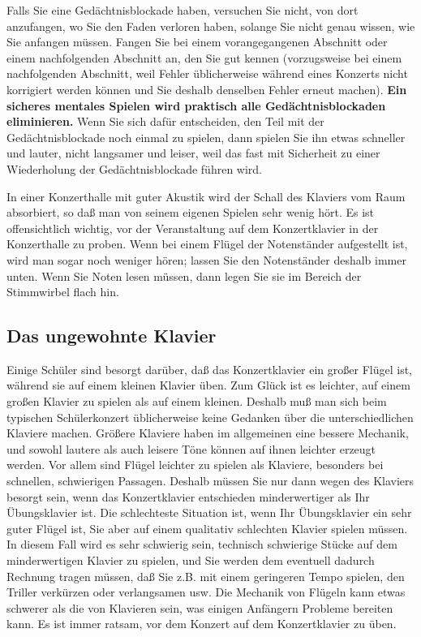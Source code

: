 Falls Sie eine Gedächtnisblockade haben, versuchen Sie nicht, von dort anzufangen, wo Sie den Faden verloren haben, solange Sie nicht genau wissen, wie Sie anfangen müssen.
Fangen Sie bei einem vorangegangenen Abschnitt oder einem nachfolgenden Abschnitt an, den Sie gut kennen (vorzugsweise bei einem nachfolgenden Abschnitt, weil Fehler üblicherweise während eines Konzerts nicht korrigiert werden können und Sie deshalb denselben Fehler erneut machen).
\textbf{Ein sicheres mentales Spielen wird praktisch alle Gedächtnisblockaden eliminieren.}
Wenn Sie sich dafür entscheiden, den Teil mit der Gedächtnisblockade noch einmal zu spielen, dann spielen Sie ihn etwas schneller und lauter, nicht langsamer und leiser, weil das fast mit Sicherheit zu einer Wiederholung der Gedächtnisblockade führen wird.

In einer Konzerthalle mit guter Akustik wird der Schall des Klaviers vom Raum absorbiert, so daß man von seinem eigenen Spielen sehr wenig hört.
Es ist offensichtlich wichtig, vor der Veranstaltung auf dem Konzertklavier in der Konzerthalle zu proben.
Wenn bei einem Flügel der Notenständer aufgestellt ist, wird man sogar noch weniger hören; lassen Sie den Notenständer deshalb immer unten.
Wenn Sie Noten lesen müssen, dann legen Sie sie im Bereich der Stimmwirbel flach hin.


\subsection{Das ungewohnte Klavier}\hypertarget{c1iii14h}{} 

Einige Schüler sind besorgt darüber, daß das Konzertklavier ein großer Flügel ist, während sie auf einem kleinen Klavier üben.
Zum Glück ist es leichter, auf einem großen Klavier zu spielen als auf einem kleinen.
Deshalb muß man sich beim typischen Schülerkonzert üblicherweise keine Gedanken über die unterschiedlichen Klaviere machen.
Größere Klaviere haben im allgemeinen eine bessere Mechanik, und sowohl lautere als auch leisere Töne können auf ihnen leichter erzeugt werden.
Vor allem sind Flügel leichter zu spielen als Klaviere, besonders bei schnellen, schwierigen Passagen.
Deshalb müssen Sie nur dann wegen des Klaviers besorgt sein, wenn das Konzertklavier entschieden minderwertiger als Ihr Übungsklavier ist.
Die schlechteste Situation ist, wenn Ihr Übungsklavier ein sehr guter Flügel ist, Sie aber auf einem qualitativ schlechten Klavier spielen müssen.
In diesem Fall wird es sehr schwierig sein, technisch schwierige Stücke auf dem minderwertigen Klavier zu spielen, und Sie werden dem eventuell dadurch Rechnung tragen müssen, daß Sie z.B. mit einem geringeren Tempo spielen, den Triller verkürzen oder verlangsamen usw.
Die Mechanik von Flügeln kann etwas schwerer als die von Klavieren sein, was einigen Anfängern Probleme bereiten kann.
Es ist immer ratsam, vor dem Konzert auf dem Konzertklavier zu üben.


